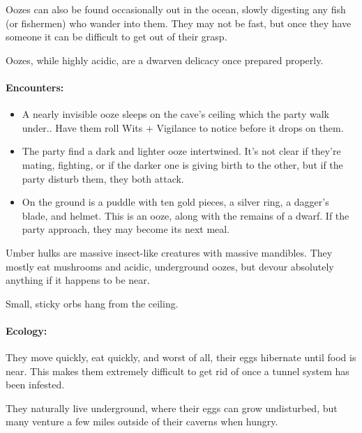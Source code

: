 \begin{multicols}{2}
Oozes can also be found occasionally out in the ocean, slowly digesting any fish (or fishermen) who wander into them.
They may not be fast, but once they have someone it can be difficult to get out of their grasp.

Oozes, while highly acidic, are a dwarven delicacy once prepared properly.

\paragraph{Encounters:}

\begin{itemize}

	\item
	A nearly invisible ooze sleeps on the cave's ceiling which the party walk under..
	Have them roll Wits + Vigilance to notice before it drops on them.
	\item
	The party find a dark and lighter ooze intertwined.
	It's not clear if they're mating, fighting, or if the darker one is giving birth to the other, but if the party disturb them, they both attack.
	\item
	On the ground is a puddle with ten gold pieces, a silver ring, a dagger's blade, and helmet.
	This is an ooze, along with the remains of a dwarf.
	If the party approach, they may become its next meal.

\end{itemize}

\jelly

\jelly

\label{umber_hulk}

Umber hulks are massive insect-like creatures with massive mandibles.
They mostly eat mushrooms and acidic, underground oozes, but devour absolutely anything if it happens to be near.

\begin{boxtext}

	Small, sticky orbs hang from the ceiling.

\end{boxtext}

\paragraph{Ecology:}
They move quickly, eat quickly, and worst of all, their eggs hibernate until food is near.
This makes them extremely difficult to get rid of once a tunnel system has been infested.

They naturally live underground, where their eggs can grow undisturbed, but many venture a few miles outside of their caverns when hungry.


\end{multicols}
